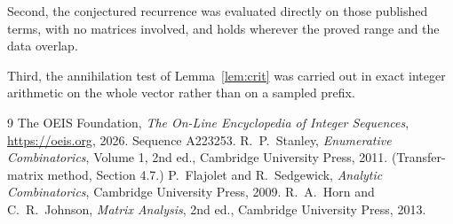 \documentclass[11pt,a4paper]{article}
\theoremstyle{plain}
\theoremstyle{definition}
\begin{document}
Second, the conjectured recurrence was evaluated directly on those published terms, with no
matrices involved, and holds wherever the proved range and the data overlap.

Third, the annihilation test of Lemma~\ref{lem:crit} was carried out in exact integer
arithmetic on the whole vector rather than on a sampled prefix.

\begin{thebibliography}{9}
 The OEIS Foundation, \emph{The On-Line Encyclopedia of Integer
Sequences}, \url{https://oeis.org}, 2026. Sequence A223253.
 R.~P.~Stanley, \emph{Enumerative Combinatorics}, Volume 1, 2nd ed.,
Cambridge University Press, 2011. (Transfer-matrix method, Section 4.7.)
 P.~Flajolet and R.~Sedgewick, \emph{Analytic Combinatorics}, Cambridge
University Press, 2009.
 R.~A.~Horn and C.~R.~Johnson, \emph{Matrix Analysis}, 2nd ed., Cambridge
University Press, 2013.
\end{thebibliography}
\end{document}
